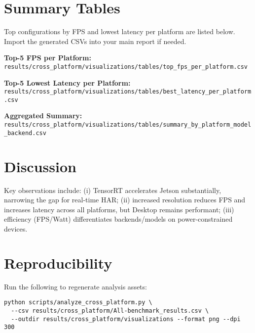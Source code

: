 \documentclass[11pt,a4paper]{article}
\begin{document}
\section{Summary Tables}
Top configurations by FPS and lowest latency per platform are listed below. Import the generated CSVs into your main report if needed.

\noindent\textbf{Top-5 FPS per Platform:} \texttt{results/cross\_platform/visualizations/tables/top\_fps\_per\_platform.csv}

\noindent\textbf{Top-5 Lowest Latency per Platform:} \texttt{results/cross\_platform/visualizations/tables/best\_latency\_per\_platform.csv}

\noindent\textbf{Aggregated Summary:} \texttt{results/cross\_platform/visualizations/tables/summary\_by\_platform\_model\_backend.csv}

\section{Discussion}
Key observations include: (i) TensorRT accelerates Jetson substantially, narrowing the gap for real-time HAR; (ii) increased resolution reduces FPS and increases latency across all platforms, but Desktop remains performant; (iii) efficiency (FPS/Watt) differentiates backends/models on power-constrained devices.

\section{Reproducibility}
Run the following to regenerate analysis assets:
\begin{verbatim}
python scripts/analyze_cross_platform.py \
  --csv results/cross_platform/All-benchmark_results.csv \
  --outdir results/cross_platform/visualizations --format png --dpi 300
\end{verbatim}
\end{document}
